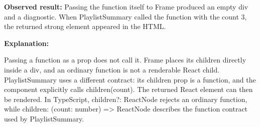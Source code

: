 \documentclass[
  10pt,
  a4paper,
  titlepage]{article}
\begin{document}
\textbf{Observed result:} Passing the function itself to Frame produced
an empty div and a diagnostic. When PlaylistSummary called the function
with the count 3, the returned strong element appeared in the HTML.


\textbf{Explanation:}

Passing a function as a prop does not call it. Frame places its children
directly inside a div, and an ordinary function is not a renderable
React child. PlaylistSummary uses a different contract: its children
prop is a function, and the component explicitly calls children(count).
The returned React element can then be rendered. In TypeScript,
children?: ReactNode rejects an ordinary function, while children:
(count: number) =\textgreater{} ReactNode describes the function
contract used by PlaylistSummary.
\end{document}
